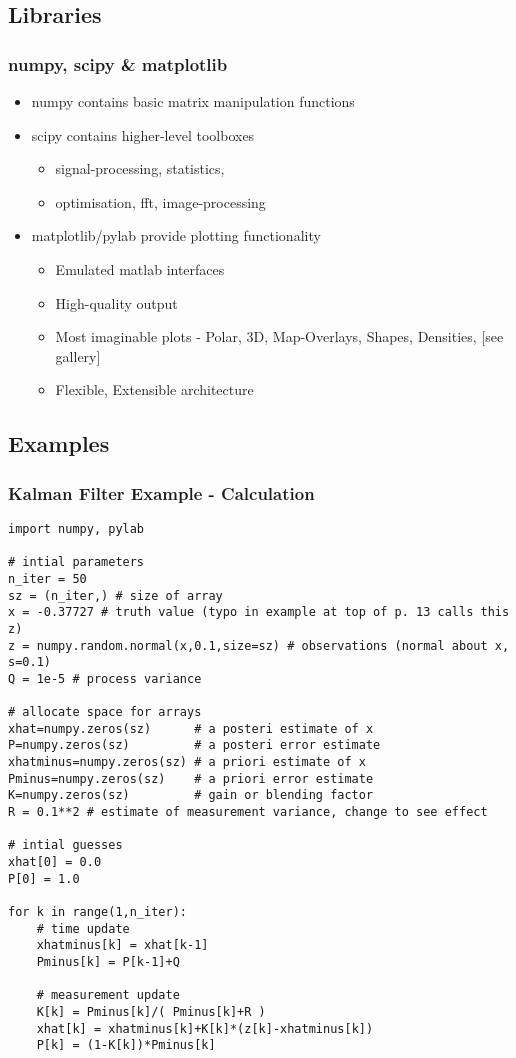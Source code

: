 \documentclass{beamer}
\begin{document}
\subsection{Libraries}
\frame
{
  \frametitle{numpy, scipy \& matplotlib}

  \begin{itemize}
  \item<1-> numpy contains basic matrix manipulation functions
  \item<2-> scipy contains higher-level toolboxes
	\begin{itemize}
  	\item<2-> signal-processing, statistics,
  	\item<2-> optimisation, fft, image-processing
	\end{itemize}
  \item<3-> matplotlib/pylab provide plotting functionality
	\begin{itemize}
  	\item<3-> Emulated matlab interfaces
  	\item<3-> High-quality output
  	\item<3-> Most imaginable plots - Polar, 3D, Map-Overlays, Shapes, Densities, [see gallery]
  	\item<3-> Flexible, Extensible architecture
	\end{itemize}

  \end{itemize}
}




\subsection{Examples}
\begin{frame}[fragile]
\tiny
\frametitle{Kalman Filter Example - Calculation}
\begin{lstlisting}
import numpy, pylab

# intial parameters
n_iter = 50
sz = (n_iter,) # size of array
x = -0.37727 # truth value (typo in example at top of p. 13 calls this z)
z = numpy.random.normal(x,0.1,size=sz) # observations (normal about x, s=0.1)
Q = 1e-5 # process variance

# allocate space for arrays
xhat=numpy.zeros(sz)      # a posteri estimate of x
P=numpy.zeros(sz)         # a posteri error estimate
xhatminus=numpy.zeros(sz) # a priori estimate of x
Pminus=numpy.zeros(sz)    # a priori error estimate
K=numpy.zeros(sz)         # gain or blending factor
R = 0.1**2 # estimate of measurement variance, change to see effect

# intial guesses
xhat[0] = 0.0
P[0] = 1.0

for k in range(1,n_iter):
    # time update
    xhatminus[k] = xhat[k-1]
    Pminus[k] = P[k-1]+Q

    # measurement update
    K[k] = Pminus[k]/( Pminus[k]+R )
    xhat[k] = xhatminus[k]+K[k]*(z[k]-xhatminus[k])
    P[k] = (1-K[k])*Pminus[k]

\end{lstlisting}
\end{frame}
\end{document}

